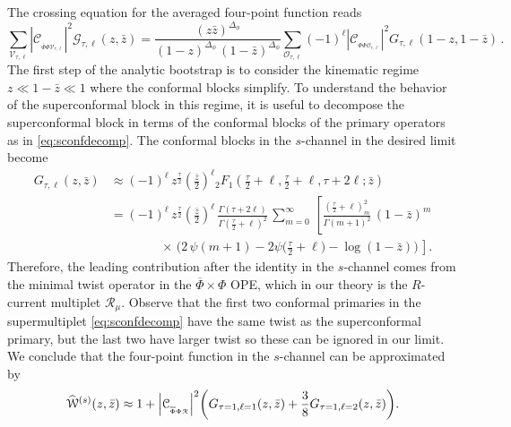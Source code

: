 \documentclass[11pt]{article}
\newcommand{\zb}{\bar{z}}
\newcommand{\Phib}{\overline{\Phi}}
\newcommand{\cope}[1]{\mathcal{C}_{_{#1}}}
\begin{document}
The crossing equation for the averaged four-point function reads
%
\begin{equation}\label{eqn:s-t_crossing}
\sum_{\mathcal{V}_{\tau,\ell}}\left|\cope{\Phib\Phi\mathcal{V}_{\tau,\ell}}\right|^2 \mathcal{G}_{\tau,\ell}(z,\zb)=\frac{(z\zb)^{\Delta_{\phi}}}{(1-z)^{\Delta_\phi}\, (1-\zb)^{\Delta_\phi}}\sum_{\mathcal{O}_{\tau,\ell}}(-1)^\ell \left|\cope{\Phi\Phi\mathcal{O}_{\tau,\ell}}\right|^2 G_{\tau,\ell}(1-z,1-\zb)\,.
\end{equation}
%
The first step of the analytic bootstrap is to consider the kinematic regime $z \ll 1-\zb \ll 1$ where the conformal blocks simplify. To understand the behavior of the superconformal block in this regime, it is useful to decompose the superconformal block in terms of the conformal blocks of the primary operators as in \eqref{eq:sconfdecomp}.  The conformal blocks in the $s$-channel in the desired limit become
%
\begin{equation}\label{eq:blocklimit}
\begin{split}
G_{\tau,\ell}(z,\zb) 
&\approx 
 (-1)^\ell \, z^{\frac{\tau}{2}}\left(\frac{\zb}{2}\right)^{\ell}{}_{2}{F}_{1}\left(\frac{\tau}{2}+\ell,\frac{\tau}{2}+\ell,\tau+2\ell;\zb\right) \\
	&= (-1)^\ell\, z^{\frac{\tau}{2}}\left(\frac{\zb}{2}\right)^{\ell} \, 
    \frac{\Gamma(\tau+2\ell)}{\Gamma\left(\frac{\tau}{2}+\ell\right)^{2}}\, 
  \sum_{m=0}^{\infty} \, 
      \left[\frac{\left(\frac{\tau}{2}+\ell \right)_m^2}{\Gamma(m+1)^2}  \,   (1-\zb)^{m}\right. 
      \\ 
&\left. \qquad\qquad 
  \times      \, 
   \bigg(2\,\psi(m+1)-2\psi\bigg(\frac{\tau}{2}+\ell\bigg)-\log(1-\zb)\bigg)\,  \right] .
\end{split}
\end{equation}
%
Therefore, the leading contribution after the identity in the $s$-channel comes from the minimal twist operator in the $\Phib \times \Phi$ OPE, which in our theory is the $R$-current  multiplet $\mathcal{R}_{\mu}$. Observe that the first two conformal primaries in the supermultiplet \eqref{eq:sconfdecomp} have the same twist as the superconformal primary, but the last two have larger twist so these can be ignored in our limit. We conclude that the four-point function in the $s$-channel can be approximated by
%
\begin{equation}\label{eq:schannelapprox}
\widehat{\mathcal{W}}^{(s)}(z,\zb) \approx 1 + \abs{\cope{\Phib\Phi\mathcal{R}}}^2\bigg(G_{\tau=1,\ell=1}(z,\zb) + \frac{3}{8}G_{\tau=1,\ell=2}(z,\zb)\bigg).
\end{equation}
%
\end{document}
